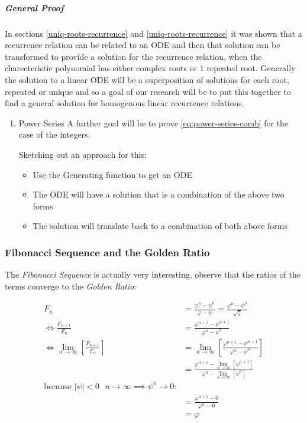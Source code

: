 \documentclass[11pt]{article}
\begin{document}
\subparagraph{General Proof}
\label{general-gen-func-proof}
In sections \ref{uniq-roots-recurrence} and \ref{uniq-roots-recurrence}
it was shown that a recurrence relation can be related to an ODE and then that
solution can be transformed to provide a solution for the recurrence relation,
when the charecteristic polynomial has either complex roots or 1 repeated root.
Generally the solution to a linear ODE will be a superposition of solutions for
each root, repeated or unique and so a goal of our research will be to put this
together to find a general solution for homogenous linear recurrence relations.
\begin{enumerate}
\item Power Series
\label{power-series-comb}
A further goal will be to prove \eqref{eq:power-series-comb} for the case of the
integers.

Sketching out an approach for this:

\begin{itemize}
\item Use the Generating function to get an ODE
\item The ODE will have a solution that is a combination of the above two forms
\item The solution will translate back to a combination of both above forms
\end{itemize}
\end{enumerate}

\subsubsection{Fibonacci Sequence and the Golden Ratio}
\label{fib-golden-ratio-proof}
The \emph{Fibonacci Sequence} is actually very interesting, observe that the ratios of the terms converge to the \emph{Golden Ratio}:

\begin{align*}
    F_n &= \frac{\varphi^n-\psi^n}{\varphi-\psi} = \frac{\varphi^n-\psi^n}{\sqrt 5} \\
    \iff \frac{F_{n+1}}{F_n}	&= \frac{\varphi^{n+ 1} - \psi^{n+  1}}{\varphi^{n} - \psi^{n}} \\
    \iff \lim_{n \rightarrow \infty}\left[ \frac{F_{n+1}}{F_n} \right]	&= \lim_{n \rightarrow \infty}\left[ \frac{\varphi^{n+ 1} - \psi^{n+  1}}{\varphi^{n} - \psi^{n}} \right] \\
&= \frac{\varphi^{n+ 1} -\lim_{n \rightarrow \infty}\left[ \psi^{n +  1} \right] }{\varphi^{n} - \lim_{n \rightarrow \infty}\left[ \psi^n \right] } \\
\text{because $\mid \psi \mid < 0$ $n \rightarrow \infty \implies \psi^{n} \rightarrow 0$:} \\
&= \frac{\varphi^{n+  1} -  0}{\varphi^{n} -  0} \\
&= \varphi
\end{align*}
\end{document}
